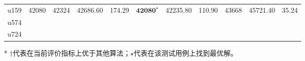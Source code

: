 \documentclass[12pt]{ctexart}
\begin{document}
\begin{table}[htbp]
\begin{tabular}{rcccccccccc}
        u159                          & 42080                             & 42324                       & 42686.60                               & 174.29           & $\textbf{42080}^\star$  & 42235.80         & 110.90           & 43668                 & 45721.40         & 35.24            \\
        u574                                                                                                                                                                                                                                                                                      \\
        u724                                                                                                                                                                                                                                                                                      \\
        \bottomrule
    \end{tabular}

    \begin{tablenotes}
        \item [*]   $\dag$代表在当前评价指标上优于其他算法；$\star$代表在该测试用例上找到最优解。
    \end{tablenotes}
\end{table}
\end{document}
